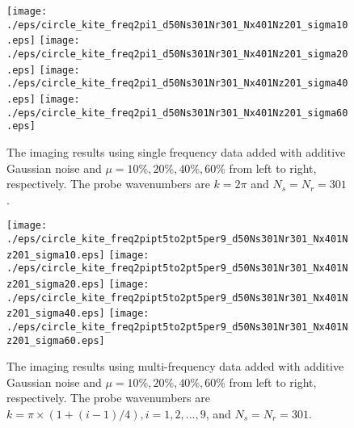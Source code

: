\documentclass[11pt]{iopart}
\begin{document}
\begin{figure}
    \centering
    \texttt{[image: ./eps/circle\_kite\_freq2pi1\_d50Ns301Nr301\_Nx401Nz201\_sigma10.eps]}
    \texttt{[image: ./eps/circle\_kite\_freq2pi1\_d50Ns301Nr301\_Nx401Nz201\_sigma20.eps]}
    \texttt{[image: ./eps/circle\_kite\_freq2pi1\_d50Ns301Nr301\_Nx401Nz201\_sigma40.eps]}
    \texttt{[image: ./eps/circle\_kite\_freq2pi1\_d50Ns301Nr301\_Nx401Nz201\_sigma60.eps]}
    \caption{The imaging results using single frequency data added with additive Gaussian noise and $\mu = 10\%, 20\%, 40\%, 60\%$ from left to right,  respectively. The probe wavenumbers are $k=2\pi$ and $N_s=N_r=301$.}\label{fig5}
\end{figure}

\begin{figure}
    \centering
    \texttt{[image: ./eps/circle\_kite\_freq2pipt5to2pt5per9\_d50Ns301Nr301\_Nx401Nz201\_sigma10.eps]}
    \texttt{[image: ./eps/circle\_kite\_freq2pipt5to2pt5per9\_d50Ns301Nr301\_Nx401Nz201\_sigma20.eps]}
    \texttt{[image: ./eps/circle\_kite\_freq2pipt5to2pt5per9\_d50Ns301Nr301\_Nx401Nz201\_sigma40.eps]}
    \texttt{[image: ./eps/circle\_kite\_freq2pipt5to2pt5per9\_d50Ns301Nr301\_Nx401Nz201\_sigma60.eps]}
    \caption{The imaging results using multi-frequency data added with additive Gaussian noise and $\mu = 10\%, 20\%, 40\%, 60\%$ from left to right,  respectively. The probe wavenumbers are $k=\pi\times(1+(i-1)/4),i=1,2,...,9$, and $N_s=N_r=301$.}\label{fig6}
\end{figure}
\end{document}
